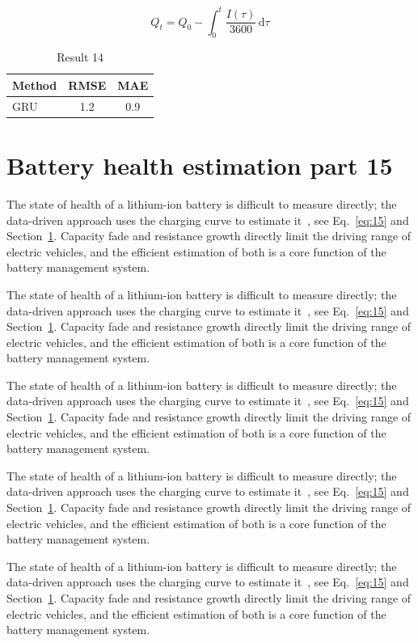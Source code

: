 \documentclass[11pt]{article}
\begin{document}
\begin{equation}\label{eq:14}
  Q_t = Q_0 - \int_0^t \frac{I(\tau)}{3600}\,\mathrm{d}\tau
\end{equation}
\begin{table}[h]\centering\begin{tabular}{lcc}\toprule Method & RMSE & MAE\\\midrule GRU & 1.2 & 0.9\\\bottomrule\end{tabular}\caption{Result 14}\end{table}

\section{Battery health estimation part 15}\label{sec:15}
The state of health of a lithium-ion battery is difficult to measure directly; the data-driven approach uses the charging curve to estimate it~\cite{a2020}, see Eq.~\eqref{eq:15} and Section~\ref{sec:15}. Capacity fade and resistance growth directly limit the driving range of electric vehicles, and the efficient estimation of both is a core function of the battery management system.

The state of health of a lithium-ion battery is difficult to measure directly; the data-driven approach uses the charging curve to estimate it~\cite{a2020}, see Eq.~\eqref{eq:15} and Section~\ref{sec:15}. Capacity fade and resistance growth directly limit the driving range of electric vehicles, and the efficient estimation of both is a core function of the battery management system.

The state of health of a lithium-ion battery is difficult to measure directly; the data-driven approach uses the charging curve to estimate it~\cite{a2020}, see Eq.~\eqref{eq:15} and Section~\ref{sec:15}. Capacity fade and resistance growth directly limit the driving range of electric vehicles, and the efficient estimation of both is a core function of the battery management system.

The state of health of a lithium-ion battery is difficult to measure directly; the data-driven approach uses the charging curve to estimate it~\cite{a2020}, see Eq.~\eqref{eq:15} and Section~\ref{sec:15}. Capacity fade and resistance growth directly limit the driving range of electric vehicles, and the efficient estimation of both is a core function of the battery management system.

The state of health of a lithium-ion battery is difficult to measure directly; the data-driven approach uses the charging curve to estimate it~\cite{a2020}, see Eq.~\eqref{eq:15} and Section~\ref{sec:15}. Capacity fade and resistance growth directly limit the driving range of electric vehicles, and the efficient estimation of both is a core function of the battery management system.
\end{document}

